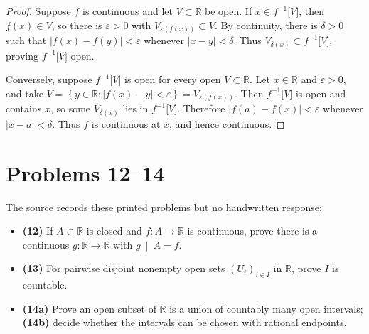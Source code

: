\begin{proof}

Suppose \(f\) is continuous and let \(V \subset \mathbb{R}\) be open. If \(x \in f^{- 1}\lbrack V\rbrack\), then \(f(x) \in V\), so there is \(\varepsilon > 0\) with \(V_{\varepsilon{({f{(x)}})}} \subset V\). By continuity, there is \(\delta > 0\) such that \(\left| {f(x) - f(y)} \right| < \varepsilon\) whenever \(\left| {x - y} \right| < \delta\). Thus \(V_{\delta{(x)}} \subset f^{- 1}\lbrack V\rbrack\), proving \(f^{- 1}\lbrack V\rbrack\) open.

Conversely, suppose \(f^{- 1}\lbrack V\rbrack\) is open for every open \(V \subset \mathbb{R}\). Let \(x \in \mathbb{R}\) and \(\varepsilon > 0\), and take \(V = \left\{ {y \in \mathbb{R}:\left| {f(x) - y} \right| < \varepsilon} \right\} = V_{\varepsilon{({f{(x)}})}}\). Then \(f^{- 1}\lbrack V\rbrack\) is open and contains \(x\), so some \(V_{\delta{(x)}}\) lies in \(f^{- 1}\lbrack V\rbrack\). Therefore \(\left| {f(a) - f(x)} \right| < \varepsilon\) whenever \(\left| {x - a} \right| < \delta\). Thus \(f\) is continuous at \(x\), and hence continuous.

\end{proof}

\section{Problems 12--14}

The source records these printed problems but no handwritten response:

\begin{itemize}
\tightlist
\item
  \textbf{(12)} If \(A \subset \mathbb{R}\) is closed and \(f:A\rightarrow\mathbb{R}\) is continuous, prove there is a continuous \(g:\mathbb{R}\rightarrow\mathbb{R}\) with \(\left. g\  \middle| \ A = f \right.\).
\item
  \textbf{(13)} For pairwise disjoint nonempty open sets \(\left( U_{i} \right)_{i \in I}\) in \(\mathbb{R}\), prove \(I\) is countable.
\item
  \textbf{(14a)} Prove an open subset of \(\mathbb{R}\) is a union of countably many open intervals; \textbf{(14b)} decide whether the intervals can be chosen with rational endpoints.
\end{itemize}
